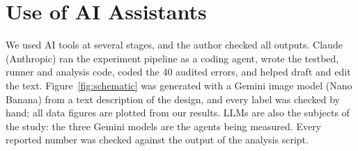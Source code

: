 \section*{Use of AI Assistants}
We used AI tools at several stages, and the author checked all outputs. Claude (Anthropic) ran the experiment pipeline as a coding agent, wrote the testbed, runner and analysis code, coded the 40 audited errors, and helped draft and edit the text. Figure~\ref{fig:schematic} was generated with a Gemini image model (Nano Banana) from a text description of the design, and every label was checked by hand; all data figures are plotted from our results. LLMs are also the subjects of the study: the three Gemini models are the agents being measured. Every reported number was checked against the output of the analysis script.
